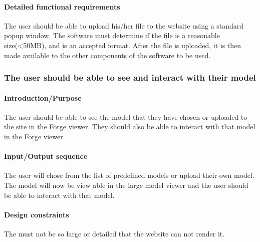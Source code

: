 \documentclass[letterpaper, 10pt, draftclsnofoot, compsoc, onecolumn]{IEEEtran}
\begin{document}
\paragraph[Detailed functional requirements of this
feature]{\rmfamily\bfseries\color{black}
Detailed functional requirements }
{\color{black} 
	The user should be able to upload his/her file to the website using a standard popup window. The software must determine if 
	the file is a reasonable size(<50MB), and is an accepted format. After the file is uploaded, it is then made available to the 
	other components of the software to be used.
 }


\subsubsection[{Viewable Model}]{\rmfamily\bfseries\color{black}
	The user should be able to see and interact with their model
}
\smallskip
\paragraph[Introduction/Purpose of this
feature]{\rmfamily\bfseries\color{black}
Introduction/Purpose }
{\color{black}
	The user should be able to see the model that they have chosen or uploaded to the site in the Forge viewer. They 
	should also be able to interact with that model in the Forge viewer. 
 }

\paragraph[Input/Output sequence for this
feature]{\rmfamily\bfseries\color{black}
Input/Output sequence }
{\color{black}
	The user will chose from the list of predefined models or upload their own model. The model will now be view able in the large 
	model viewer and the user should be able to interact with that model.
 }

\paragraph[Design constraints of this
feature]{\rmfamily\bfseries\color{black} Design constraints }
{\color{black}
	The must not be so large or detailed that the website can not render it.
}
\end{document}
